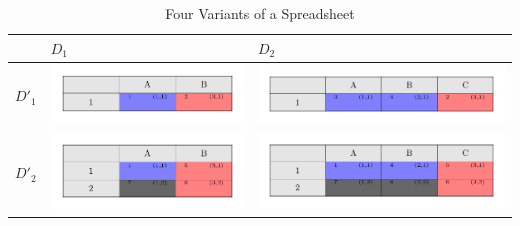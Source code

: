 \documentclass[conference]{IEEEtran}
\newcommand{\figscale}{0.6}
\begin{document}
\begin{table}
\centering
  \begin{tabular}{|>{\centering\arraybackslash}m{2em}|>{\centering\arraybackslash}m{18em} >{\centering\arraybackslash}m{25em}|}
    \hline
    & $D_1$ & $D_2$ \\ \hline
    $D'_1$ & \includegraphics[scale=\figscale]{tikz/2dims1} 
      & \includegraphics[scale=\figscale]{tikz/2dims2} \\
      $D'_2$ & \includegraphics[scale=\figscale]{tikz/2dims3}
      & \includegraphics[scale=\figscale]{tikz/2dims4} \\ \hline
  \end{tabular}
  \caption{Four Variants of a Spreadsheet}\label{tbl:fourvar}
\end{table}

\end{document}
